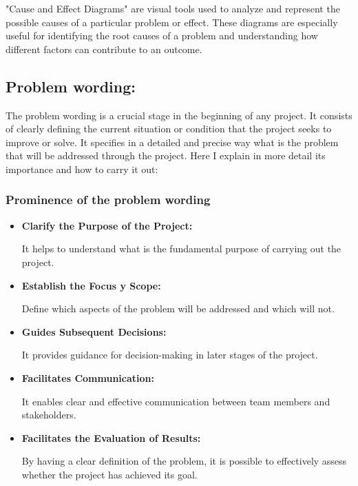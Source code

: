 \documentclass{article}
\begin{document}
\par "Cause and Effect Diagrams" are visual tools used to analyze and represent
the possible causes of a particular problem or effect. These diagrams are
especially useful for identifying the root causes of a problem and understanding
how different factors can contribute to an outcome.

\subsection{Problem wording:}
\par The problem wording is a crucial stage in the beginning of any project. It
consists of clearly defining the current situation or condition that the
project seeks to improve or solve. It specifies in a detailed and precise way
what is the problem that will be addressed through the project. Here I explain
in more detail its importance and how to carry it out:

\subsubsection{Prominence of the problem wording}
\begin{itemize}
	\item
	      \textbf{Clarify the Purpose of the Project:}
	      \par It helps to understand what is the fundamental purpose of carrying
	      out the project.
	\item
	      \textbf{Establish the Focus y Scope:}
	      \par Define which aspects of the problem will be addressed and which
	      will not.
	\item
	      \textbf{Guides Subsequent Decisions:}
	      \par It provides guidance for decision-making in later stages of the
	      project.
	\item
	      \textbf{Facilitates Communication:}
	      \par It enables clear and effective communication between team members
	      and stakeholders.
	\item
	      \textbf{Facilitates the Evaluation of Results:}
	      \par By having a clear definition of the problem, it is possible to
	      effectively assess whether the project has achieved its goal.
\end{itemize}
\end{document}

